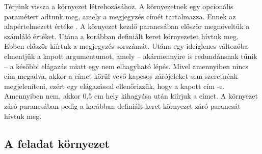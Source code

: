 Térjünk vissza a környezet létrehozásához. A környezetnek egy opcionális
paramétert adtunk meg, amely a megjegyzés címét tartalmazza. Ennek az
alapértelmezett értéke
.
A környezet kezdő parancsában először megnöveltük a számláló értéket.
Utána a korábban definiált keret környezetet hívtuk meg. Ebben először
kiírtuk a megjegyzés sorszámát. Utána egy ideiglenes változóba elmentjük
a kapott argumentumot, amely -- akármennyire is redundánsnak tűnik --  a későbbi
elágazás miatt egy nem elhagyható lépés. Mivel amennyiben nincs cím megadva,
akkor a címet körül vevő kapcsos zárójeleket sem szeretnénk megjeleníteni,
ezért egy elágazással ellenőrizzük, hogy a kapott cím
-e.
Amennyiben nem, akkor 0,5 em hely kihagyása után kiírjuk a címet. A környezet
záró parancsában pedig a korábban definiált keret környezet záró parancsát
hívtuk meg.

\subsection{A feladat környezet}

